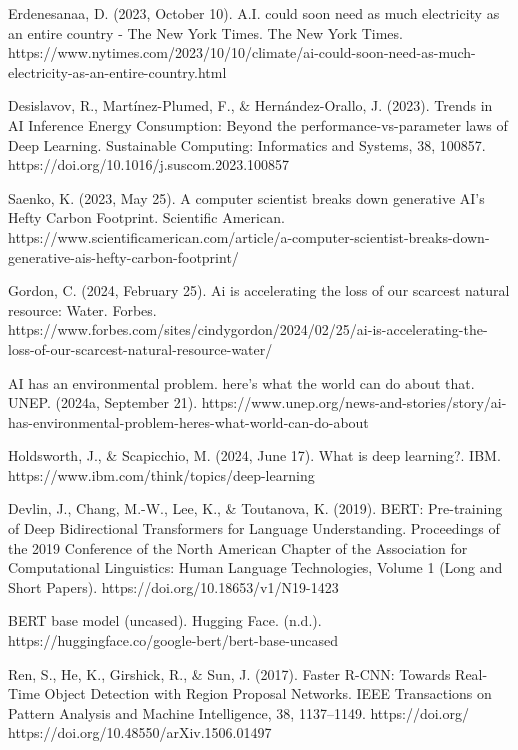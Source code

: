 \documentclass[licencjacka,en]{pracamgr}
\begin{document}
\begin{thebibliography}{99}
Erdenesanaa, D. (2023, October 10). A.I. could soon need as much electricity as an entire country - The New York Times. The New York Times. https://www.nytimes.com/2023/10/10/climate/ai-could-soon-need-as-much-electricity-as-an-entire-country.html 

Desislavov, R., Martínez-Plumed, F., \& Hernández-Orallo, J. (2023). Trends in AI Inference Energy Consumption: Beyond the performance-vs-parameter laws of Deep Learning. Sustainable Computing: Informatics and Systems, 38, 100857. https://doi.org/10.1016/j.suscom.2023.100857 

Saenko, K. (2023, May 25). A computer scientist breaks down generative AI’s Hefty Carbon Footprint. Scientific American. https://www.scientificamerican.com/article/a-computer-scientist-breaks-down-generative-ais-hefty-carbon-footprint/ 

Gordon, C. (2024, February 25). Ai is accelerating the loss of our scarcest natural resource: Water. Forbes. https://www.forbes.com/sites/cindygordon/2024/02/25/ai-is-accelerating-the-loss-of-our-scarcest-natural-resource-water/ 

AI has an environmental problem. here’s what the world can do about that. UNEP. (2024a, September 21). https://www.unep.org/news-and-stories/story/ai-has-environmental-problem-heres-what-world-can-do-about 

Holdsworth, J., \& Scapicchio, M. (2024, June 17). What is deep learning?. IBM. https://www.ibm.com/think/topics/deep-learning 

Devlin, J., Chang, M.-W., Lee, K., \& Toutanova, K. (2019). BERT: Pre-training of Deep Bidirectional Transformers for Language Understanding. Proceedings of the 2019 Conference of the North {A}merican Chapter of the Association for Computational Linguistics: Human Language Technologies, Volume 1 (Long and Short Papers). https://doi.org/10.18653/v1/N19-1423 

BERT base model (uncased).  Hugging Face. (n.d.). https://huggingface.co/google-bert/bert-base-uncased 

Ren, S., He, K., Girshick, R., \& Sun, J. (2017). Faster R-CNN: Towards Real-Time Object Detection with Region Proposal Networks. IEEE Transactions on Pattern Analysis and Machine Intelligence, 38, 1137–1149. https://doi.org/ https://doi.org/10.48550/arXiv.1506.01497 


\end{thebibliography}
\end{document}
